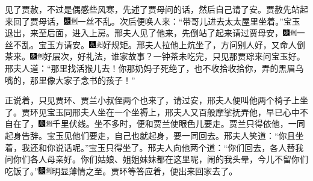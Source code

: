 见了贾赦，不过是偶感些风寒，先述了贾母问的话，然后自己请了安。贾赦先站起来回了贾母话，{\includegraphics[width=3mm]{../Images/00004}\includegraphics[width=3mm]{../Images/00011}\footnotesize \kaishu 一丝不乱。}次后便唤人来：“带哥儿进去太太屋里坐着。”宝玉退出，来至后面，进入上房。邢夫人见了他来，先倒站了起来请过贾母安，{\includegraphics[width=3mm]{../Images/00004}\includegraphics[width=3mm]{../Images/00011}\footnotesize \kaishu 一丝不乱。}宝玉方请安。{\includegraphics[width=3mm]{../Images/00009}\includegraphics[width=3mm]{../Images/00012}\footnotesize \kaishu 好规矩。}邢夫人拉他上炕坐了，方问别人好，又命人倒茶来。{\includegraphics[width=3mm]{../Images/00004}\includegraphics[width=3mm]{../Images/00011}\footnotesize \kaishu 好层次，好礼法，谁家故事？}一钟茶未吃完，只见那贾琮来问宝玉好。邢夫人道：“那里找活猴儿去！你那奶妈子死绝了，也不收拾收拾你，弄的黑眉乌嘴的，那里像大家子念书的孩子！”

正说着，只见贾环、贾兰小叔侄两个也来了，请过安，邢夫人便叫他两个椅子上坐了。贾环见宝玉同邢夫人坐在一个坐褥上，邢夫人又百般摩挲抚弄他，早已心中不自在了，{\includegraphics[width=3mm]{../Images/00004}\includegraphics[width=3mm]{../Images/00011}\footnotesize \kaishu 千里伏线。}坐不多时，便和贾兰使眼色儿要走。贾兰只得依他，一同起身告辞。宝玉见他们要走，自己也就起身，要一同回去。邢夫人笑道：“你且坐着，我还和你说话呢。”宝玉只得坐了。邢夫人向他两个道：“你们回去，各人替我问你们各人母亲好。你们姑娘、姐姐妹妹都在这里呢，闹的我头晕，今儿不留你们吃饭了。”{\includegraphics[width=3mm]{../Images/00004}\includegraphics[width=3mm]{../Images/00011}\footnotesize \kaishu 明显薄情之至。}贾环等答应着，便出来回家去了。

